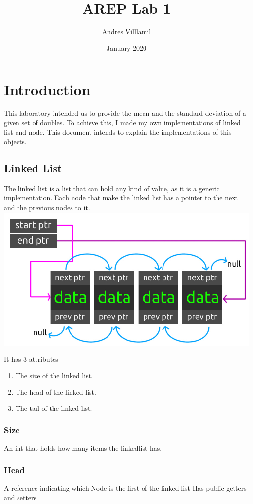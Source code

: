 \documentclass{article}
\title{AREP Lab 1}
\author{Andres Villlamil }
\date{January 2020}
\begin{document}
\maketitle

\section{Introduction}
This laboratory intended us to provide the mean and the standard deviation of a given set of doubles. To achieve this, I made my own implementations of linked list and node. This document intends to explain the implementations of this objects.




\subsection{Linked List}
The linked list  is a list that can hold any kind of value, as it is a generic implementation. Each node that make the linked list has a pointer to
the next and the previous nodes to it.
\includegraphics[width=\linewidth]{resources/img/linkedlist.png}

It has 3 attributes
\begin{enumerate}
    \item The size of the linked list.
    \item The head of the linked list.
    \item The tail of the linked list.
\end{enumerate}
\subsubsection{Size}
An int that holds how many items the linkedlist has.
\subsubsection{Head}
A reference indicating which Node is the first of the linked list
Has public getters and setters
\end{document}

